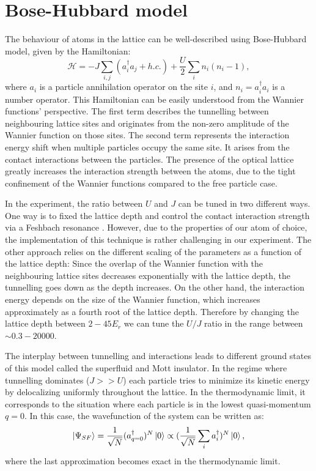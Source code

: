 \section{Bose-Hubbard model}
The behaviour of atoms in the lattice can be well-described using Bose-Hubbard model, given by the Hamiltonian:
\begin{equation}
\mathcal{H} = -J\sum_{i,j} (a_i^\dagger a_j + h.c.) + \frac{U}{2} \sum_i n_i(n_i-1),
\end{equation}
where $a_i$ is a particle annihilation operator on the site $i$, and $n_i = a_i^\dagger a_i$ is a number operator. This Hamiltonian can be easily understood from the Wannier functions' perspective. The first term describes the tunnelling between neighbouring lattice sites and originates from the non-zero amplitude of the Wannier function on those sites. The second term represents the interaction energy shift when multiple particles occupy the same site. It arises from the contact interactions between the particles. The presence of the optical lattice greatly increases the interaction strength between the atoms, due to the tight confinement of the Wannier functions compared to the free particle case.

In the experiment, the ratio between $U$ and $J$ can be tuned in two different ways. One way is to fixed the lattice depth and control the contact interaction strength via a Feshbach resonance \cite{Chin2010}. However, due to the properties of our atom of choice, the implementation of this technique is rather challenging in our experiment. The other approach relies on the different scaling of the parameters as a function of the lattice depth: Since the overlap of the Wannier function with the neighbouring lattice sites decreases exponentially with the lattice depth, the tunnelling goes down as the depth increases. On the other hand, the interaction energy depends on the size of the Wannier function, which increases approximately as a fourth root of the lattice depth. Therefore by changing the lattice depth between $2-45 E_r$ we can tune the $U/J$ ratio in the range between $\sim 0.3-20000$.

The interplay between tunnelling and interactions leads to different ground states of this model called the superfluid and Mott insulator. In the regime where tunnelling dominates ($J>>U$) each particle tries to minimize its kinetic energy by delocalizing uniformly throughout the lattice. In the thermodynamic limit, it corresponds to the situation where each particle is in the lowest quasi-momentum $q=0$. In this case, the wavefunction of the system can be written as:
\begin{equation}
\left|\Psi_{SF}\right\rangle = \frac{1}{\sqrt{N}}(a_{q=0}^\dagger)^N\left|0\right\rangle \propto (\frac{1}{\sqrt{N}}\sum_i a_i^\dagger)^N\left|0\right\rangle,
\end{equation}
where the last approximation becomes exact in the thermodynamic limit.

